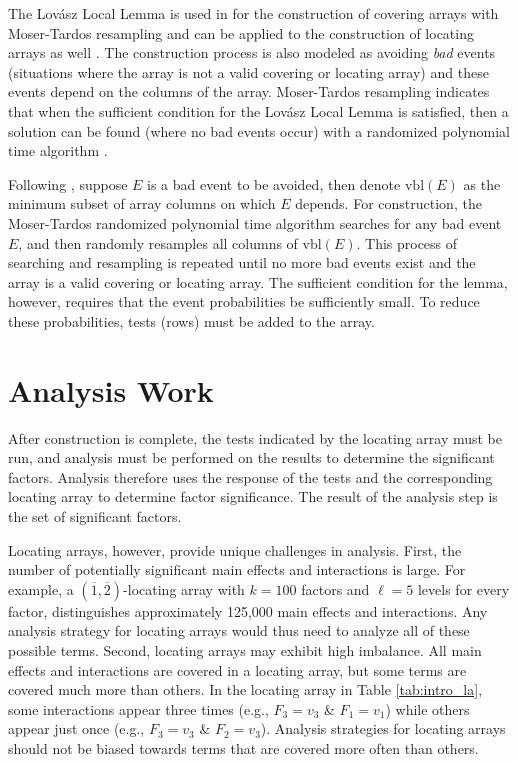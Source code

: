 The Lov{\'a}sz Local Lemma \cite{LovaszLocalLemma} is used in \cite{Sarkar} for the construction of covering arrays with Moser-Tardos resampling \cite{moser10} and can be applied to the construction of locating arrays as well \cite{CSmics}.
The construction process is also modeled as avoiding {\em bad} events (situations where the array is not a valid covering or locating array) \cite{Sarkar} and these events depend on the columns of the array.
Moser-Tardos resampling indicates that when the sufficient condition for the Lov{\'a}sz Local Lemma is satisfied, then a solution can be found (where no bad events occur) with a randomized polynomial time algorithm \cite{moser10}.

Following \cite{Sarkar}, suppose $E$ is a bad event to be avoided, then denote $\mathrm{vbl}(E)$ as the minimum subset of array columns on which $E$ depends.
For construction, the Moser-Tardos randomized polynomial time algorithm searches for any bad event $E$, and then randomly resamples all columns of $\mathrm{vbl}(E)$.
This process of searching and resampling is repeated until no more bad events exist and the array is a valid covering or locating array.
The sufficient condition for the lemma, however, requires that the event probabilities be sufficiently small.
To reduce these probabilities, tests (rows) must be added to the array.

\section{Analysis Work} \label{sect:rel_analysis}

After construction is complete, the tests indicated by the locating array must be run, and analysis must be performed on the results to determine the significant factors.
Analysis therefore uses the response of the tests and the corresponding locating array to determine factor significance.
The result of the analysis step is the set of significant factors.

Locating arrays, however, provide unique challenges in analysis.
First, the number of potentially significant main effects and interactions is large.
For example, a $(\overline{1},\overline{2})$-locating array with $k = 100$ factors and $\ell = 5$ levels for every factor, distinguishes approximately 125,000 main effects and interactions.
Any analysis strategy for locating arrays would thus need to analyze all of these possible terms.
Second, locating arrays may exhibit high imbalance.
All main effects and interactions are covered in a locating array, but some terms are covered much more than others.
In the locating array in Table \ref{tab:intro_la}, some interactions appear three times (e.g., $F_3=v_3$ \& $F_1=v_1$) while others appear just once (e.g., $F_3=v_3$ \& $F_2=v_3$).
Analysis strategies for locating arrays should not be biased towards terms that are covered more often than others.

